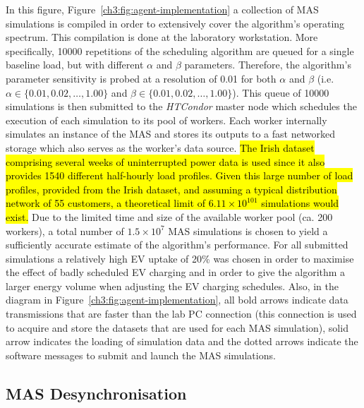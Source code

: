 In this figure, Figure~\ref{ch3:fig:agent-implementation} a collection of MAS simulations is compiled in order to extensively cover the algorithm's operating spectrum.
This compilation is done at the laboratory workstation.
More specifically, 10000 repetitions of the scheduling algorithm are queued for a single baseline load, but with different $\alpha$ and $\beta$ parameters.
Therefore, the algorithm's parameter sensitivity is probed at a resolution of 0.01 for both $\alpha$ and $\beta$ (i.e. $\alpha \in \{0.01, 0.02, \dots, 1.00\}$ and $\beta \in \{0.01, 0.02, \dots, 1.00\}$).
This queue of 10000 simulations is then submitted to the \textit{HTCondor} master node which schedules the execution of each simulation to its pool of workers.
Each worker internally simulates an instance of the MAS and stores its outputs to a fast networked storage which also serves as the worker's data source.
\hl{The Irish dataset }\cite{IrishData2002}\hl{ comprising several weeks of uninterrupted power data is used since it also provides 1540 different half-hourly load profiles.
Given this large number of load profiles, provided  from the Irish dataset, and assuming a typical distribution network of 55 customers, a theoretical limit of $6.11\times10^{101}$ simulations would exist.}
Due to the limited time and size of the available worker pool (ca. 200 workers), a total number of $1.5\times10^{7}$ MAS simulations is chosen to yield a sufficiently accurate estimate of the algorithm's performance.
For all submitted simulations a relatively high EV uptake of 20\% was chosen in order to maximise the effect of badly scheduled EV charging and in order to give the algorithm a larger energy volume when adjusting the EV charging schedules.
Also, in the diagram in Figure~\ref{ch3:fig:agent-implementation}, all bold arrows indicate data transmissions that are faster than the lab PC connection (this connection is used to acquire and store the datasets that are used for each MAS simulation), solid arrow indicates the loading of simulation data and the dotted arrows indicate the software messages to submit and launch the MAS simulations.

\subsection{MAS Desynchronisation}
\label{ch3:subsec:desynchronisation}

